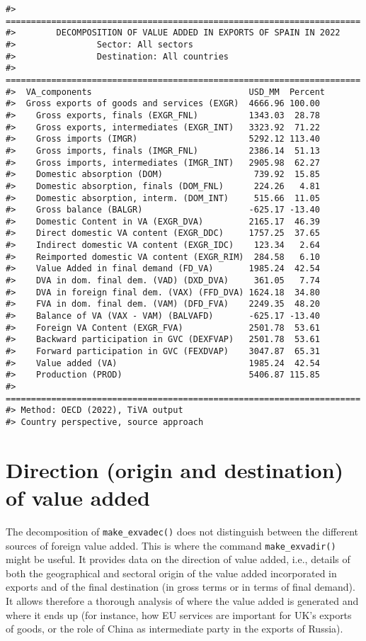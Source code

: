 \begin{verbatim}
#> ======================================================================
#>        DECOMPOSITION OF VALUE ADDED IN EXPORTS OF SPAIN IN 2022
#>                Sector: All sectors
#>                Destination: All countries
#> ======================================================================
#>  VA_components                               USD_MM  Percent
#>  Gross exports of goods and services (EXGR)  4666.96 100.00 
#>    Gross exports, finals (EXGR_FNL)          1343.03  28.78 
#>    Gross exports, intermediates (EXGR_INT)   3323.92  71.22 
#>    Gross imports (IMGR)                      5292.12 113.40 
#>    Gross imports, finals (IMGR_FNL)          2386.14  51.13 
#>    Gross imports, intermediates (IMGR_INT)   2905.98  62.27 
#>    Domestic absorption (DOM)                  739.92  15.85 
#>    Domestic absorption, finals (DOM_FNL)      224.26   4.81 
#>    Domestic absorption, interm. (DOM_INT)     515.66  11.05 
#>    Gross balance (BALGR)                     -625.17 -13.40 
#>    Domestic Content in VA (EXGR_DVA)         2165.17  46.39 
#>    Direct domestic VA content (EXGR_DDC)     1757.25  37.65 
#>    Indirect domestic VA content (EXGR_IDC)    123.34   2.64 
#>    Reimported domestic VA content (EXGR_RIM)  284.58   6.10 
#>    Value Added in final demand (FD_VA)       1985.24  42.54 
#>    DVA in dom. final dem. (VAD) (DXD_DVA)     361.05   7.74 
#>    DVA in foreign final dem. (VAX) (FFD_DVA) 1624.18  34.80 
#>    FVA in dom. final dem. (VAM) (DFD_FVA)    2249.35  48.20 
#>    Balance of VA (VAX - VAM) (BALVAFD)       -625.17 -13.40 
#>    Foreign VA Content (EXGR_FVA)             2501.78  53.61 
#>    Backward participation in GVC (DEXFVAP)   2501.78  53.61 
#>    Forward participation in GVC (FEXDVAP)    3047.87  65.31 
#>    Value added (VA)                          1985.24  42.54 
#>    Production (PROD)                         5406.87 115.85 
#> ======================================================================
#> Method: OECD (2022), TiVA output
#> Country perspective, source approach
\end{verbatim}

\hypertarget{direction-origin-and-destination-of-value-added}{%
\section{Direction (origin and destination) of value added}\label{direction-origin-and-destination-of-value-added}}

The decomposition of \texttt{make\_exvadec()} does not distinguish between the different
sources of foreign value added. This is where the command \texttt{make\_exvadir()} might
be useful. It provides data on the direction of value added, i.e., details of
both the geographical and sectoral origin of the value added incorporated in
exports and of the final destination (in gross terms or in terms of final
demand). It allows therefore a thorough analysis of where the value added is
generated and where it ends up (for instance, how EU services are important for
UK's exports of goods, or the role of China as intermediate party in the exports
of Russia).

